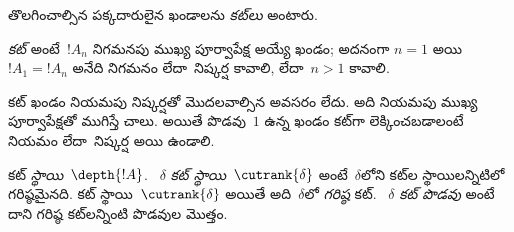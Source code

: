\documentclass[../../../include/open-logic-section]{subfiles}
\begin{document}
తొలగించాల్సిన పక్కదారులైన ఖండాలను \emph{కట్‌లు} అంటారు.

\begin{defn}
\emph{కట్} అంటే~$!A_n$  నిగమనపు ముఖ్య పూర్వాపేక్ష అయ్యే ఖండం; అదనంగా $n=1$ అయి $!A_1 = !A_n$ అనేది  నిగమనం లేదా~\FalseInt నిష్కర్ష కావాలి, లేదా~$n>1$ కావాలి.
\end{defn}

కట్ ఖండం  నియమపు నిష్కర్షతో మొదలవాల్సిన అవసరం లేదు. అది  నియమపు ముఖ్య పూర్వాపేక్షతో ముగిస్తే చాలు. అయితే పొడవు~$1$ ఉన్న ఖండం కట్‌గా లెక్కించబడాలంటే  నియమం లేదా~\FalseInt నిష్కర్ష అయి ఉండాలి.

\begin{defn}
కట్ \emph{స్థాయి}~$\depth{!A}$. ~$\delta$ \emph{కట్ స్థాయి}~$\cutrank{\delta}$ అంటే~$\delta$లోని కట్‌ల స్థాయిలన్నిటిలో గరిష్ఠమైనది. కట్ స్థాయి~$\cutrank{\delta}$ అయితే అది~$\delta$లో \emph{గరిష్ఠ} కట్. ~$\delta$ \emph{కట్ పొడవు} అంటే దాని గరిష్ఠ కట్‌లన్నింటి పొడవుల మొత్తం.
\end{defn}
\end{document}
